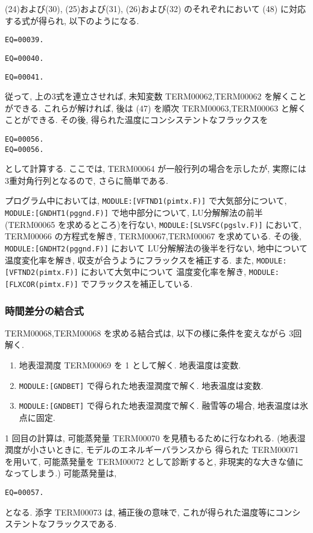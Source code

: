 (24)および(30), 
(25)および(31), 
(26)および(32)  のそれぞれにおいて
(48) に対応する式が得られ, 以下のようになる.

\begin{verbatim}
EQ=00039.
\end{verbatim}
\begin{verbatim}
EQ=00040.
\end{verbatim}
\begin{verbatim}
EQ=00041.
\end{verbatim}

従って, 上の3式を連立させれば,
未知変数 TERM00062,TERM00062 を解くことができる.
これらが解ければ, 後は
(47) を順次 TERM00063,TERM00063 と解くことができる.
%
その後, 得られた温度にコンシステントなフラックスを
\begin{verbatim}
EQ=00056.
EQ=00056.
\end{verbatim}
として計算する.
%
ここでは, TERM00064 が一般行列の場合を示したが,
実際には3重対角行列となるので, さらに簡単である.

プログラム中においては,
\texttt{MODULE:[VFTND1(pimtx.F)]} で大気部分について,
\texttt{MODULE:[GNDHT1(pggnd.F)]} で地中部分について, LU分解解法の前半
(TERM00065 を求めるところ)を行ない, 
\texttt{MODULE:[SLVSFC(pgslv.F)]} において, TERM00066 の方程式を解き,
TERM00067,TERM00067 を求めている.
その後, \texttt{MODULE:[GNDHT2(pggnd.F)]} において
LU分解解法の後半を行ない, 地中について温度変化率を解き, 
収支が合うようにフラックスを補正する.
また, \texttt{MODULE:[VFTND2(pimtx.F)]} において大気中について
温度変化率を解き, 
\texttt{MODULE:[FLXCOR(pimtx.F)]} でフラックスを補正している.

\subsubsection{時間差分の結合式}

TERM00068,TERM00068 を求める結合式は, 
以下の様に条件を変えながら 3回解く. 
\begin{enumerate}
\item 地表湿潤度 TERM00069 を 1 として解く. 地表温度は変数. 
\item \texttt{MODULE:[GNDBET]} で得られた地表湿潤度で解く. 
      地表温度は変数.
\item \texttt{MODULE:[GNDBET]} で得られた地表湿潤度で解く. 
      融雪等の場合, 地表温度は氷点に固定. 
\end{enumerate}

1 回目の計算は, 可能蒸発量 TERM00070 を見積もるために行なわれる.
(地表湿潤度が小さいときに, モデルのエネルギーバランスから
得られた TERM00071 を用いて, 可能蒸発量を
TERM00072
として診断すると, 非現実的な大きな値になってしまう.)
可能蒸発量は,
\begin{verbatim}
EQ=00057.
\end{verbatim}
となる.
添字 TERM00073 は, 補正後の意味で, 
これが得られた温度等にコンシステントなフラックスである.
    
